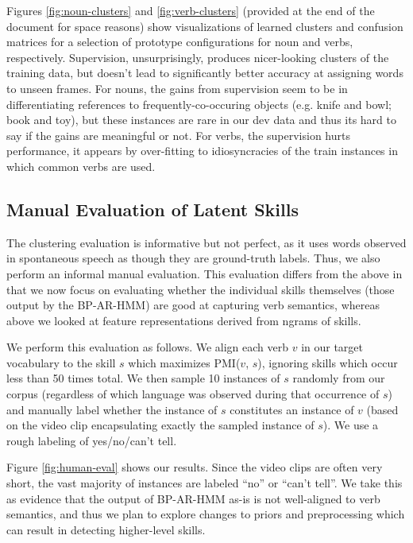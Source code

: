 \documentclass[11pt]{article}
\begin{document}
Figures \ref{fig:noun-clusters} and \ref{fig:verb-clusters} (provided at the end of the document for space reasons) show visualizations of learned clusters and confusion matrices for a selection of prototype configurations for noun and verbs, respectively. Supervision, unsurprisingly, produces nicer-looking clusters of the training data, but doesn't lead to significantly better accuracy at assigning words to unseen frames. For nouns,  the gains from supervision seem to be in differentiating references to frequently-co-occuring objects (e.g. knife and bowl; book and toy), but these instances are rare in our dev data and thus its hard to say if the gains are meaningful or not. For verbs, the supervision hurts performance, it appears by over-fitting to idiosyncracies of the train instances in which common verbs are used.

\subsection{Manual Evaluation of Latent Skills}

The clustering evaluation is informative but not perfect, as it uses words observed in spontaneous speech as though they are ground-truth labels. Thus, we also perform an informal manual evaluation. This evaluation differs from the above in that we now focus on evaluating whether the individual skills themselves (those output by the BP-AR-HMM) are good at capturing verb semantics, whereas above we looked at feature representations derived from ngrams of skills. 

We perform this evaluation as follows. We align each verb $v$ in our target vocabulary to the skill $s$ which maximizes PMI($v$, $s$), ignoring skills which occur less than 50 times total. We then sample 10 instances of $s$ randomly from our corpus (regardless of which language was observed during that occurrence of $s$) and manually label whether the instance of $s$ constitutes an instance of $v$ (based on the video clip encapsulating exactly the sampled instance of $s$). We use a rough labeling of yes/no/can't tell.

Figure \ref{fig:human-eval} shows our results. Since the video clips are often very short, the vast majority of instances are labeled ``no'' or ``can't tell''. We take this as evidence that the output of BP-AR-HMM as-is is not well-aligned to verb semantics, and thus we plan to explore changes to priors and preprocessing which can result in detecting higher-level skills.
\end{document}
